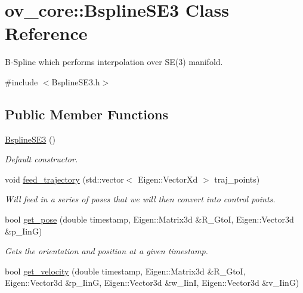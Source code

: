 \hypertarget{classov__core_1_1BsplineSE3}{}\section{ov\+\_\+core\+:\+:Bspline\+S\+E3 Class Reference}
\label{classov__core_1_1BsplineSE3}


B-\/\+Spline which performs interpolation over S\+E(3) manifold.  




{\ttfamily \#include $<$Bspline\+S\+E3.\+h$>$}

\subsection*{Public Member Functions}
\begin{DoxyCompactItemize}
\item 
\mbox{\label{classov__core_1_1BsplineSE3_a1c4d986ac85cab989d26638f6ede2245}} 
\hyperlink{classov__core_1_1BsplineSE3_a1c4d986ac85cab989d26638f6ede2245}{Bspline\+S\+E3} ()
\begin{DoxyCompactList}\small\item\em Default constructor. \end{DoxyCompactList}\item 
void \hyperlink{classov__core_1_1BsplineSE3_a2031f15f618b1e4654f5933a987b1cd2}{feed\+\_\+trajectory} (std\+::vector$<$ Eigen\+::\+Vector\+Xd $>$ traj\+\_\+points)
\begin{DoxyCompactList}\small\item\em Will feed in a series of poses that we will then convert into control points. \end{DoxyCompactList}\item 
bool \hyperlink{classov__core_1_1BsplineSE3_a2b80d8e6bf5fe51a35b789ab3c68f6a3}{get\+\_\+pose} (double timestamp, Eigen\+::\+Matrix3d \&R\+\_\+\+GtoI, Eigen\+::\+Vector3d \&p\+\_\+\+IinG)
\begin{DoxyCompactList}\small\item\em Gets the orientation and position at a given timestamp. \end{DoxyCompactList}\item 
bool \hyperlink{classov__core_1_1BsplineSE3_abf2eacd708d5adb25741fe7806a3c7a6}{get\+\_\+velocity} (double timestamp, Eigen\+::\+Matrix3d \&R\+\_\+\+GtoI, Eigen\+::\+Vector3d \&p\+\_\+\+IinG, Eigen\+::\+Vector3d \&w\+\_\+\+IinI, Eigen\+::\+Vector3d \&v\+\_\+\+IinG)

\end{DoxyCompactItemize}

